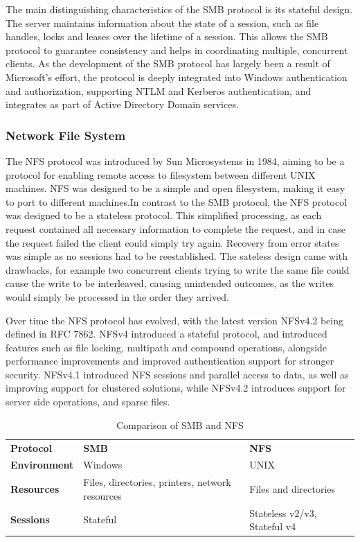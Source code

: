 \documentclass[english, 12pt, a4paper, elec, utf8, a-2b, online]{aaltothesis}
\begin{document}
The main distinguishing characteristics of the SMB protocol is its stateful design.
The server maintains information about the state of a session, such as file handles,
locks and leases over the lifetime of a session. This allows the SMB protocol to
guarantee consistency and helps in coordinating multiple, concurrent clients. As 
the development of the SMB protocol has largely been a result of Microsoft's effort,
the protocol is deeply integrated into Windows authentication and authorization,
supporting NTLM and Kerberos authentication, and integrates as part of Active Directory Domain
services\cite{smb2}.

\subsubsection{Network File System}

The NFS protocol was introduced by Sun Microsystems in 1984, aiming to be a protocol
for enabling remote access to filesystem between different UNIX machines. NFS was
designed to be a simple and open filesystem, making it easy to port to different
machines.In contrast to the SMB protocol, the NFS protocol was designed to be a 
stateless protocol. This simplified processing, as each request contained all necessary
information to complete the request, and in case the request failed the client could
simply try again. Recovery from error states was simple as no sessions had to be
reestablished. The sateless design came with drawbacks,
for example two concurrent clients trying to write the same file could cause the
write to be interleaved, causing unintended outcomes, as the writes would simply
be processed in the order they arrived\cite{nfs_design}.

Over time the NFS protocol has evolved, with the latest version NFSv4.2 being
defined in RFC 7862\cite{rfc7862}. NFSv4 introduced a stateful protocol, and
introduced features such as file locking, multipath and compound operations, alongside performance
improvements and improved authentication support for stronger security\cite{rfc7530}.
NFSv4.1 introduced NFS sessions and parallel access to data, as well as improving support
for clustered solutions\cite{rfc8881}, while
NFSv4.2 introduces support for server side operations, and sparse files\cite{rfc7862}.

\begin{table}[h]
	\centering
	\caption{Comparison of SMB and NFS}
	\label{tab:smb_nfs}
	\begin{tabular}{lll}
	\textbf{Protocol} & \textbf{SMB} & \textbf{NFS} \\
	\textbf{Environment}    & Windows     & UNIX    \\
	\textbf{Resources} &  Files, directories, printers, network resources   & Files and directories     \\
	\textbf{Sessions}  & Stateful  & Stateless v2/v3, Stateful v4    \\
	\end{tabular}
\end{table}
\end{document}
